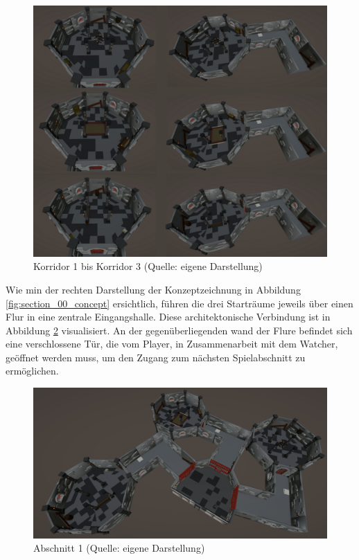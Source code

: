 \begin{figure}[ht]
\centering
\includegraphics[width=1\linewidth]{content/pictures/Room_00-Room_02-Corridor_00-Corridor_02.png}
\caption{Korridor 1 bis Korridor 3 (Quelle: eigene Darstellung)}
\label{fig:corridors}
\end{figure}

Wie min der rechten Darstellung der Konzeptzeichnung in Abbildung \ref{fig:section_00_concept} ersichtlich, führen die drei Starträume jeweils über einen Flur in eine zentrale Eingangshalle. Diese architektonische Verbindung ist in Abbildung \ref{fig:section_00} visualisiert. An der gegenüberliegenden wand der Flure befindet sich eine verschlossene Tür, die vom Player, in Zusammenarbeit mit dem Watcher, geöffnet werden muss, um den Zugang zum nächsten Spielabschnitt zu ermöglichen.

\begin{figure}[ht]
\centering
\includegraphics[width=1\linewidth]{content/pictures/Abschnitt_00.PNG}
\caption{Abschnitt 1 (Quelle: eigene Darstellung)}
\label{fig:section_00}
\end{figure}


